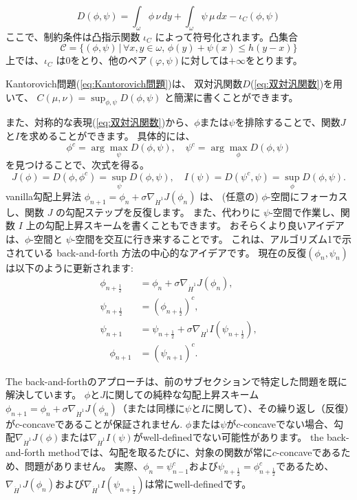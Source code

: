\documentclass{jsarticle}
\theoremstyle{definition}
\begin{document}
\begin{equation}
  \label{eq:双対汎関数}
  D(\phi, \psi) = \int_\omega \phi \,\nu\, dy + \int_\omega \psi \,\mu\, dx - \iota_C(\phi,\psi)
\end{equation}
ここで、制約条件は凸指示関数 $\iota_C$ によって符号化されます。凸集合
$$
\mathcal{C}  = \{(\phi,\psi) \,| \, \forall x,y \in \omega,\, \phi(y) + \psi(x) \leq h(y-x)\}
$$
上では、$\iota_C$ は0をとり、他のペア$(\varphi, \psi)$に対しては$+ \infty$をとります。

\color{teal}
Kantorovich問題(\ref{eq:Kantorovich問題})は、 双対汎関数$D$(\ref{eq:双対汎関数})を用いて、
$C(\mu, \nu) = \sup_{\phi, \psi} D(\phi, \psi)$
と簡潔に書くことができます。

また、対称的な表現(\ref{eq:双対汎関数})から、$\phi$または$\psi$を排除することで、関数$J$と$I$を求めることができます。
具体的には、
$$
\phi^c = \arg\max_\psi D(\phi, \psi), \quad \psi^c = \arg\max_\phi D(\phi, \psi)
$$
を見つけることで、次式を得る。
$$
J(\phi) = D(\phi, \phi^c) = \sup_\psi D(\phi, \psi), \quad I(\psi) = D(\psi^c, \psi) = \sup_\phi D(\phi, \psi).
$$
\color{black}
vanilla勾配上昇法 $\phi_{n+1} = \phi_n + \sigma\nabla_{\dot{H}^1} J(\phi_n)$ は、
(任意の) $\phi$-空間にフォーカスし、関数 $J$ の勾配ステップを反復します。
また、代わりに $\psi$-空間で作業し、関数 $I$ 上の勾配上昇スキームを書くこともできます。
おそらくより良いアイデアは、$\phi$-空間と $\psi$-空間を交互に行き来することです。
これは、アルゴリズム1で示されている back-and-forth 方法の中心的なアイデアです。
現在の反復$(\phi_n, \psi_n)$は以下のように更新されます:
\begin{align*}
  \phi_{n+\frac{1}{2}} &= \phi_n + \sigma \nabla_{\dot{H}^1} J(\phi_n),\\
  \psi_{n+\frac{1}{2}} &= (\phi_{n+\frac{1}{2}})^c,\\
  \psi_{n+1} &= \psi_{n+\frac{1}{2}} + \sigma \nabla_{\dot{H}^1} I(\psi_{n+\frac{1}{2}}), \\
  \quad \phi_{n+1} &= (\psi_{n+1})^c.
\end{align*} 


The back-and-forthのアプローチは、前のサブセクションで特定した問題を既に解決しています。 
$\phi$と$J$に関しての純粋な勾配上昇スキーム$\phi_{n + 1} = \phi_n + \sigma \nabla_{\dot{H}^1} J(\phi_n)$（または同様に$\psi$と$I$に関して）、その繰り返し（反復）が$c$-concaveであることが保証されません.
$\phi$または$\psi$が$c$-concaveでない場合、勾配$\nabla_{\dot{H}^1} J(\phi)$または$\nabla_{\dot{H}^1} I(\psi)$がwell-definedでない可能性があります。
{\color{red}
the back-and-forth methodでは、勾配を取るたびに、対象の関数が常に$c$-concaveであるため、問題がありません。
実際、$\phi_n = \psi_{n -1}^c$および$\psi_{n + \frac{1}{2}} = \phi^c_{n + \frac{1}{2}}$であるため、$\nabla_{\dot{H}^1} J(\phi_n)$および$\nabla_{\dot{H}^1} I(\psi_{n + \frac{1}{2}})$は常にwell-definedです。\\
}
\end{document}
